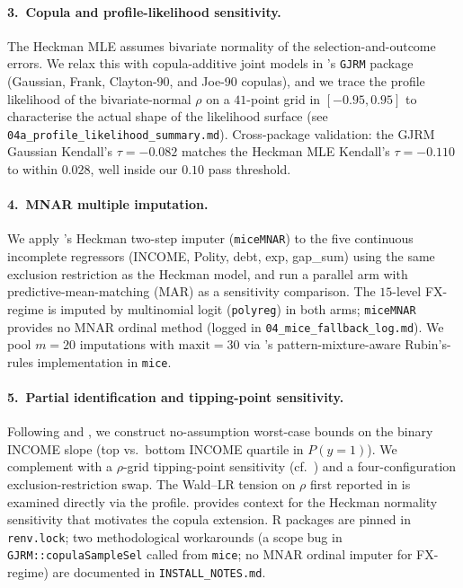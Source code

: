 \documentclass[11pt]{article}
\begin{document}
\paragraph{3.~Copula and profile-likelihood sensitivity.} The Heckman
MLE assumes bivariate normality of the selection-and-outcome errors.
We relax this with copula-additive joint models in
\citet{marra2017}'s \texttt{GJRM} package (Gaussian, Frank,
Clayton-90, and Joe-90 copulas), and we trace the profile likelihood
of the bivariate-normal $\rho$ on a $41$-point grid in $[-0.95, 0.95]$
to characterise the actual shape of the likelihood surface
(see \texttt{04a\_profile\_likelihood\_summary.md}).
Cross-package validation: the GJRM Gaussian Kendall's $\tau = -0.082$
matches the Heckman MLE Kendall's $\tau = -0.110$ to within $0.028$,
well inside our $0.10$ pass threshold.

\paragraph{4.~MNAR multiple imputation.} We apply
\citeauthor{galimard2018}'s Heckman two-step imputer
(\texttt{miceMNAR}) to the five continuous incomplete regressors
(INCOME, Polity, debt, exp, gap\_sum) using the same exclusion
restriction as the Heckman model, and run a parallel arm with
predictive-mean-matching (MAR) as a sensitivity comparison. The
$15$-level FX-regime is imputed by multinomial logit (\texttt{polyreg})
in both arms; \texttt{miceMNAR} provides no MNAR ordinal method
(logged in \texttt{04\_mice\_fallback\_log.md}).
We pool $m = 20$ imputations with $\mathrm{maxit} = 30$ via
\citeauthor{little1993}'s pattern-mixture-aware Rubin's-rules
implementation in \texttt{mice}.

\paragraph{5.~Partial identification and tipping-point sensitivity.}
Following \citet{horowitz1998} and \citet{manski1995}, we construct
no-assumption worst-case bounds on the binary INCOME slope (top vs.\
bottom INCOME quartile in $P(y = 1)$). We complement with a
$\rho$-grid tipping-point sensitivity (cf.~\citealp{zuehlke2003}) and
a four-configuration exclusion-restriction swap. The Wald--LR tension
on $\rho$ first reported in \citet{self1987} is examined directly via
the profile. \citet{puhani2000} provides context for the Heckman
normality sensitivity that motivates the copula extension. R packages
are pinned in \texttt{renv.lock}; two methodological workarounds (a
scope bug in \texttt{GJRM::copulaSampleSel} called from \texttt{mice};
no MNAR ordinal imputer for FX-regime) are documented in
\texttt{INSTALL\_NOTES.md}.
\end{document}
